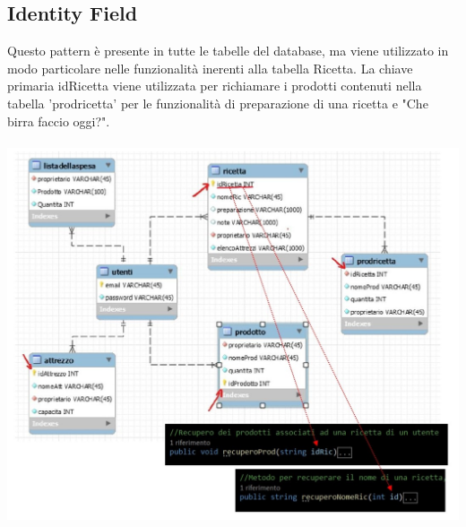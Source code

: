 \documentclass[a4paper, titlepage]{article}
\begin{document}
\subsection{Identity Field}
Questo pattern è presente in tutte le tabelle del database, ma viene utilizzato in modo particolare nelle funzionalità inerenti alla tabella Ricetta.
La chiave primaria idRicetta viene utilizzata per richiamare i prodotti contenuti nella tabella 'prodricetta' per le funzionalità di preparazione di una ricetta e "Che birra faccio oggi?".\\\\
\includegraphics[scale=0.40]{Immagini/IdentityField.jpg}
\end{document}
